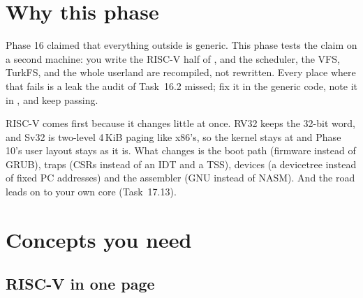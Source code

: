 \documentclass[11pt,a4paper]{article}
\begin{document}
\renewcommand{\progresslabel}{Stage V progress toward Turk-OS 2.0 (this phase in red)}


\section{Why this phase}

Phase 16 claimed that everything outside  is generic. This phase tests the claim on a second
machine: you write the RISC-V half of , and the scheduler, the VFS, TurkFS,  and the
whole userland are recompiled, not rewritten. Every place where that fails is a leak the audit of Task~16.2 missed; fix
it in the generic code, note it in , and keep  passing.

RISC-V comes first because it changes little at once. RV32 keeps the 32-bit word, and Sv32 is two-level 4\,KiB paging
like x86's, so the kernel stays at  and Phase 10's user layout stays as it is. What changes is the boot
path (firmware instead of GRUB), traps (CSRs instead of an IDT and a TSS), devices (a devicetree instead of fixed PC
addresses) and the assembler (GNU  instead of NASM). And the road leads on to your own core (Task~17.13).

\section{Concepts you need}

\subsection{RISC-V in one page}
\end{document}
